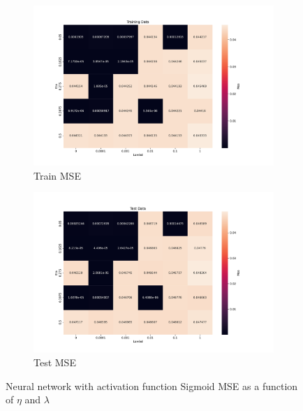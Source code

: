 \begin{figure}[htpb]
\begin{subfigure}{.5\textwidth}
  \centering
  \includegraphics[width=1.2\linewidth]{Figures/PartB/train_sigmoid_MSE(eta,lmb)}
  \caption{Train MSE}
  \label{fig:train_sigmoid_MSE-eta-lmb-}
\end{subfigure}%
\begin{subfigure}{.5\textwidth}
  \centering
  \includegraphics[width=1.2\linewidth]{Figures/PartB/test_sigmoid_MSE(eta,lmb)}
  \caption{Test MSE}
  \label{fig:test_sigmoid_MSE-eta-lmb-}
\end{subfigure}
\caption{Neural network with activation function Sigmoid MSE as a function of \(\eta \) and \(\lambda \) }
\label{fig:Sigmoid_MSE}
\end{figure}

